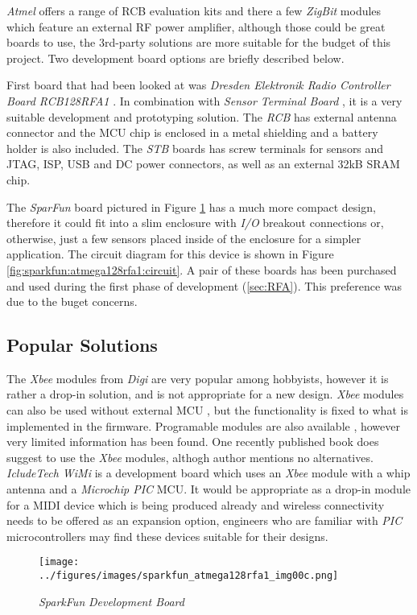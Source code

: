  \emph{Atmel} offers a range of RCB evaluation kits
 \cite{links:atmel:rcb} and there a few \emph{ZigBit}
 modules which feature an external RF power amplifier,
 although those could be great boards to use, the
 3rd-party solutions are more suitable for the budget
 of this project. Two development board options are
 briefly described below.

 First  board that had been looked at 
 was \emph{Dresden Elektronik Radio Controller Board RCB128RFA1}
 \cite{links:de:rcb}. In combination with \emph{Sensor Terminal
 Board} \cite{links:de:stb}, it is a very suitable development 
 and prototyping solution. The \emph{RCB} has external antenna
 connector and the MCU chip is enclosed in a metal shielding
 and a battery holder is also included. The \emph{STB} boards
 has screw terminals for sensors and JTAG, ISP, USB and DC
 power connectors, as well as an external 32kB SRAM chip.

 The \emph{SparFun} board pictured in Figure
 \ref{fig:sparkfun:atmega128rfa1:image}
 has a much more compact design, therefore it could fit
 into a slim enclosure with \emph{I/O} breakout connections
 or, otherwise, just a few sensors placed inside of the
 enclosure for a simpler application. The circuit diagram
 for this device is shown in Figure
 \ref{fig:sparkfun:atmega128rfa1:circuit}.
 A pair of these boards has been purchased and used during
 the first phase of development (\ref{sec:RFA}).
 This preference was due to the buget concerns.

\subsection{Popular Solutions}

 The \emph{Xbee} \cite{links:digi:xbee} modules from \emph{Digi}
 are very popular among hobbyists, however it is rather a
 drop-in solution, and is not appropriate for a new design.
 \emph{Xbee} modules can also be used without external MCU
 \cite{links:misc:xbeemidi}, but the functionality is fixed
 to what is implemented in the firmware. Programable modules
 are also available \cite{links:xbee:wiki:prog}, however very
 limited information has been found. One recently published
 book \cite{noble2009programming} does suggest to use the
 \emph{Xbee} modules, althogh author mentions no alternatives.
 \emph{IcludeTech WiMi} \cite{links:includetech:wimi}
 is a development board which uses an \emph{Xbee} module with a whip
 antenna and a \emph{Microchip PIC} MCU. It would be appropriate as a
 drop-in module for a MIDI device which is being produced already and
 wireless connectivity needs to be offered as an expansion option,
 engineers who are familiar with \emph{PIC} microcontrollers may find
 these devices suitable for their designs.

\begin{figure}
\centering
\texttt{[image: ../figures/images/sparkfun\_atmega128rfa1\_img00c.png]}
\caption{\emph{SparkFun}  \emph{Development Board}} \label{fig:sparkfun:atmega128rfa1:image}
\end{figure}
\pagebreak


